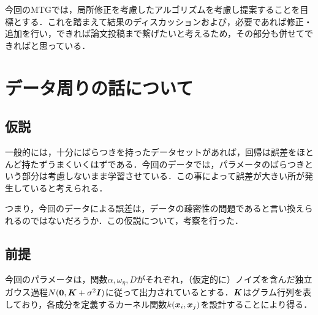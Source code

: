 \documentclass[16.7pt]{jsarticle}
\begin{document}
		
	\articleSPRobj
		今回のMTGでは，局所修正を考慮したアルゴリズムを考慮し提案することを目標とする．これを踏まえて結果のディスカッションおよび，必要であれば修正・追加を行い，できれば論文投稿まで繋げたいと考えるため，その部分も併せてできればと思っている．
		

	\articleSPRitemsone
		
		\tableofcontents
		
		
	\articleSPRitemstwo
	\renewcommand{\labelitemi}{$\blacktriangledown$}
	\newcommand{\argmax}{\mathop{\rm arg~max}\limits}
	\newcommand{\argmin}{\mathop{\rm arg~min}\limits}
	\newcommand{\Ker}{{\rm Ker}}
	\newcommand{\rank}{{\rm rank}}
\section{データ周りの話について}
		\subsection{仮説}
		一般的には，十分にばらつきを持ったデータセットがあれば，回帰は誤差をほとんど持たずうまくいくはずである．今回のデータでは，パラメータのばらつきという部分は考慮しないまま学習させている．この事によって誤差が大きい所が発生していると考えられる．
		
		つまり，今回のデータによる誤差は，データの疎密性の問題であると言い換えられるのではないだろうか．この仮説について，考察を行った．
		\subsection{前提}
		今回のパラメータは，関数$ \alpha,\omega_{\eta},D $がそれぞれ，（仮定的に）ノイズを含んだ独立ガウス過程$ N(\boldsymbol{0},\boldsymbol{K} + \sigma^2 \boldsymbol{I}) $に従って出力されているとする．$ \boldsymbol{K} $はグラム行列を表しており，各成分を定義するカーネル関数$ k(\boldsymbol{x}_i,\boldsymbol{x}_j) $を設計することにより得る．
\end{document}
